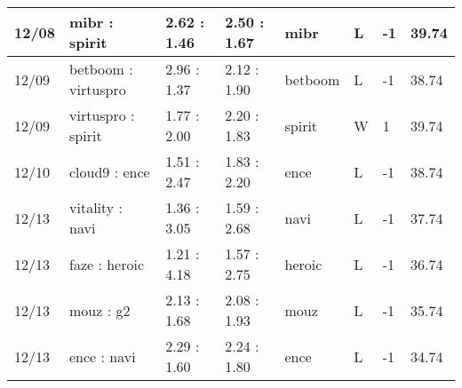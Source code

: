 \begin{small}
\begin{longtable}{|l|l|l|l|l|l|l|l|}
	12/08                               & mibr : spirit                       & 2.62 : 1.46                             & 2.50 : 1.67                             & mibr                              & L                                 & -1                                   & 39.74                             \\ \hline
	12/09                               & betboom : virtuspro                 & 2.96 : 1.37                             & 2.12 : 1.90                             & betboom                           & L                                 & -1                                   & 38.74                             \\ \hline
	12/09                               & virtuspro : spirit                  & 1.77 : 2.00                             & 2.20 : 1.83                             & spirit                            & W                                 & 1                                    & 39.74                             \\ \hline
	12/10                               & cloud9 : ence                       & 1.51 : 2.47                             & 1.83 : 2.20                             & ence                              & L                                 & -1                                   & 38.74                             \\ \hline
	12/13                               & vitality : navi                     & 1.36 : 3.05                             & 1.59 : 2.68                             & navi                              & L                                 & -1                                   & 37.74                             \\ \hline
	12/13                               & faze : heroic                       & 1.21 : 4.18                             & 1.57 : 2.75                             & heroic                            & L                                 & -1                                   & 36.74                             \\ \hline
	12/13                               & mouz : g2                           & 2.13 : 1.68                             & 2.08 : 1.93                             & mouz                              & L                                 & -1                                   & 35.74                             \\ \hline
	12/13                               & ence : navi                         & 2.29 : 1.60                             & 2.24 : 1.80                             & ence                              & L                                 & -1                                   & 34.74                             \\ \hline

\end{longtable}
\end{small}
